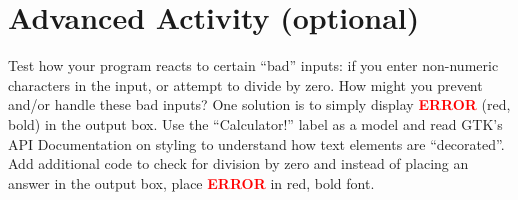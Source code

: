 \documentclass[12pt]{scrartcl}
\begin{document}
\section{Advanced Activity (optional)}

Test how your program reacts to certain ``bad'' inputs: if you enter 
non-numeric characters in the input, or attempt to divide by zero.  
How might you prevent and/or handle these bad inputs?  One 
solution is to simply display \textbf{\textcolor{red}{ERROR}} (red, 
bold) in the output box.  Use the ``Calculator!'' label as a model 
and read GTK's API Documentation on styling to understand 
how text elements are ``decorated''.  Add additional code to 
check for division by zero and instead of placing an answer in 
the output box, place \textbf{\textcolor{red}{ERROR}} in red, bold font.

	
\end{document}
